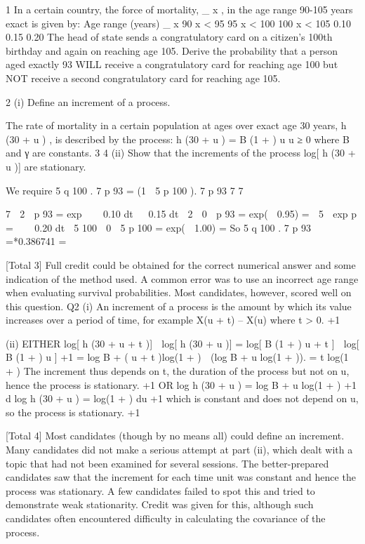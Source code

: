 \documentclass[a4paper,12pt]{article}
\begin{document}
1
In a certain country, the force of mortality, \mu_ x , in the age range 90-105 years exact is
given by:
Age range (years) \mu_ x
90 \leq x < 95
95 \leq x < 100
100 \leq x < 105 0.10
0.15
0.20
The head of state sends a congratulatory card on a citizen’s 100th birthday and again
on reaching age 105.
Derive the probability that a person aged exactly 93 WILL receive a congratulatory
card for reaching age 100 but NOT receive a second congratulatory card for reaching
age 105.

2
(i)
Define an increment of a process.

The rate of mortality in a certain population at ages over exact age 30 years, h (30 + u ) ,
is described by the process:
h (30 + u ) \;=\; B (1 + \gamma ) u u ≥ 0
where B and γ are constants.
3
4
(ii) Show that the increments of the process log[ h (30 + u )] are stationary.



We require 5 q 100 . 7 p 93 \;=\; (1  5 p 100 ). 7 p 93
7
7

7
 2

p 93 \;=\; exp    0.10 dt   0.15 dt 
2
 0
 
p 93 \;=\; exp(  0.95) \;= 
 5

exp
p
\;=\;
   0.20 dt 
5 100
 0

5 p 100
\;=\; exp(  1.00) \;=
So 5 q 100 . 7 p 93 \;=*0.386741 \;=



[Total 3]
Full credit could be obtained for the correct numerical answer and some
indication of the method used. A common error was to use an incorrect age
range when evaluating survival probabilities. Most candidates, however,
scored well on this question.
Q2
(i) An increment of a process is the amount by which its value increases over a
period of time, for example X(u + t) – X(u) where t > 0.
+1

(ii) EITHER
log[ h (30 + u + t )]  log[ h (30 + u )] \;=\; log[ B (1 + \gamma ) u + t ]  log[ B (1 + \gamma ) u ] +1
\;=\; log B + ( u + t )log(1 + \gamma )  (log B + u log(1 + \gamma )). 
\;=\; t log(1 + \gamma ) 
The increment thus depends on t, the duration of the process but not
on u, hence the process is stationary. +1
OR
log h (30 + u ) \;=\; log B + u log(1 + \gamma ) +1
d
log h (30 + u ) \;=\; log(1 + \gamma )
du +1
which is constant and does not depend on u, so the process is stationary.
+1

[Total 4]
Most candidates (though by no means all) could define an increment. Many
candidates did not make a serious attempt at part (ii), which dealt with a topic
that had not been examined for several sessions. The better-prepared
candidates saw that the increment for each time unit was constant and hence
the process was stationary. A few candidates failed to spot this and tried to
demonstrate weak stationarity. Credit was given for this, although such
candidates often encountered difficulty in calculating the covariance of the
process.

\end{document}
